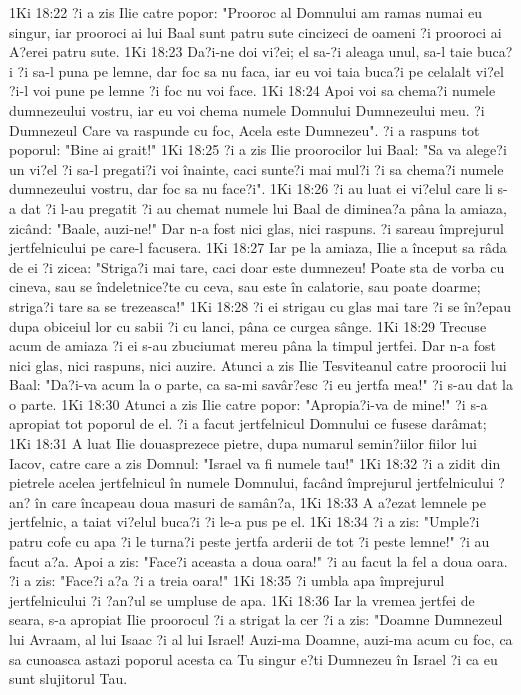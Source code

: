 1Ki 18:22  ?i a zis Ilie catre popor: "Prooroc al Domnului am ramas numai eu singur, iar prooroci ai lui Baal sunt patru sute cincizeci de oameni ?i prooroci ai A?erei patru sute.
1Ki 18:23  Da?i-ne doi vi?ei; el sa-?i aleaga unul, sa-l taie buca?i ?i sa-l puna pe lemne, dar foc sa nu faca, iar eu voi taia buca?i pe celalalt vi?el ?i-l voi pune pe lemne ?i foc nu voi face.
1Ki 18:24  Apoi voi sa chema?i numele dumnezeului vostru, iar eu voi chema numele Domnului Dumnezeului meu. ?i Dumnezeul Care va raspunde cu foc, Acela este Dumnezeu". ?i a raspuns tot poporul: "Bine ai grait!"
1Ki 18:25  ?i a zis Ilie proorocilor lui Baal: "Sa va alege?i un vi?el ?i sa-l pregati?i voi înainte, caci sunte?i mai mul?i ?i sa chema?i numele dumnezeului vostru, dar foc sa nu face?i".
1Ki 18:26  ?i au luat ei vi?elul care li s-a dat ?i l-au pregatit ?i au chemat numele lui Baal de diminea?a pâna la amiaza, zicând: "Baale, auzi-ne!" Dar n-a fost nici glas, nici raspuns. ?i sareau împrejurul jertfelnicului pe care-l facusera.
1Ki 18:27  Iar pe la amiaza, Ilie a început sa râda de ei ?i zicea: "Striga?i mai tare, caci doar este dumnezeu! Poate sta de vorba cu cineva, sau se îndeletnice?te cu ceva, sau este în calatorie, sau poate doarme; striga?i tare sa se trezeasca!"
1Ki 18:28  ?i ei strigau cu glas mai tare ?i se în?epau dupa obiceiul lor cu sabii ?i cu lanci, pâna ce curgea sânge.
1Ki 18:29  Trecuse acum de amiaza ?i ei s-au zbuciumat mereu pâna la timpul jertfei. Dar n-a fost nici glas, nici raspuns, nici auzire. Atunci a zis Ilie Tesviteanul catre proorocii lui Baal: "Da?i-va acum la o parte, ca sa-mi savâr?esc ?i eu jertfa mea!" ?i s-au dat la o parte.
1Ki 18:30  Atunci a zis Ilie catre popor: "Apropia?i-va de mine!" ?i s-a apropiat tot poporul de el. ?i a facut jertfelnicul Domnului ce fusese darâmat;
1Ki 18:31  A luat Ilie douasprezece pietre, dupa numarul semin?iilor fiilor lui Iacov, catre care a zis Domnul: "Israel va fi numele tau!"
1Ki 18:32  ?i a zidit din pietrele acelea jertfelnicul în numele Domnului, facând împrejurul jertfelnicului ?an? în care încapeau doua masuri de samân?a,
1Ki 18:33  A a?ezat lemnele pe jertfelnic, a taiat vi?elul buca?i ?i le-a pus pe el.
1Ki 18:34  ?i a zis: "Umple?i patru cofe cu apa ?i le turna?i peste jertfa arderii de tot ?i peste lemne!" ?i au facut a?a. Apoi a zis: "Face?i aceasta a doua oara!" ?i au facut la fel a doua oara. ?i a zis: "Face?i a?a ?i a treia oara!"
1Ki 18:35  ?i umbla apa împrejurul jertfelnicului ?i ?an?ul se umpluse de apa.
1Ki 18:36  Iar la vremea jertfei de seara, s-a apropiat Ilie proorocul ?i a strigat la cer ?i a zis: "Doamne Dumnezeul lui Avraam, al lui Isaac ?i al lui Israel! Auzi-ma Doamne, auzi-ma acum cu foc, ca sa cunoasca astazi poporul acesta ca Tu singur e?ti Dumnezeu în Israel ?i ca eu sunt slujitorul Tau.
